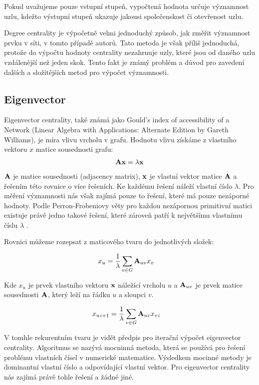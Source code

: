 \documentclass[12pt,titlepage]{report}
\begin{document}
Pokud uvažujeme pouze vstupní stupeň, vypočtená hodnota určuje významnost uzlu, kdežto výstupní stupeň ukazuje jakousi společenskost či otevřenost uzlu. 

Degree centrality je výpočetně velmi jednoduchý způsob, jak změřit významnost
prvku v síti, v tomto případě autorů. Tato metoda je však příliš jednoduchá,
protože do výpočtu hodnoty centrality nezahrnuje uzly, které jsou od daného
uzlu vzdálenější než jeden skok. Tento fakt je známý problém a důvod pro
zavedení dalších a složitějších metod pro výpočet významnosti.



\subsection{Eigenvector}
Eigenvector centrality, také známá jako Gould's index of accessibility of a
Network (Linear Algebra with Applications: Alternate Edition by Gareth
Williams), je míra vlivu vrcholu v grafu. Hodnotu vlivu získáme z vlastního
vektoru $x$ matice sousednosti grafu:
\begin{align}
{\bf Ax} &= \lambda {\bf x} \\
\end{align}
${\bf A}$ je matice sousednosti (adjacency matrix), ${\bf x}$ je vlastní vektor
matice ${\bf A}$ a řešením této rovnice o více řešeních. Ke každému řešení
náleží vlastní číslo $\lambda$. Pro měření významnosti nás však zajímá pouze to
řešení, které má pouze nezáporné hodnoty. Podle Perron-Frobeniovy věty pro
každou nezápornou primitivní matici existuje právě jedno takové řešení, které
zároveň patří k největšímu vlastnímu číslu $\lambda$ \cite{langvillemeyer}.

Rovnici můžeme rozepsat z maticového tvaru do jednotlivých složek:

\begin{align} 
x_u &=  \frac{1}{\lambda} \displaystyle\sum_{v \in G} {\bf A}_{uv} x_v 
\end{align} 

Kde $x_u$ je prvek vlastního vektoru ${\bf x}$
náležící vrcholu $u$ a ${\bf A}_{uv}$ je prvek matice sousednosti ${\bf A}$,
který leží na řádku $u$ a sloupci $v$.

\begin{align} 
{x_u}_{i + 1} &=  \frac{1}{\lambda} \displaystyle\sum_{v \in G} {\bf A}_{uv}
{x_v}_{i}
\end{align} 

V tomhle rekurentním tvaru je vidět předpis pro iterační výpočet eigenvector
centrality. Algoritmus se nazývá mocninná metoda, která se používá pro řešení
problému vlastních čísel v numerické matematice. Výsledkem mocinné metody je
dominantní vlastní číslo a odpovídající vlastní vektor. Pro eigenvector
centrality nás zajímá právě tohle řešení a žádné jiné.
\end{document}
